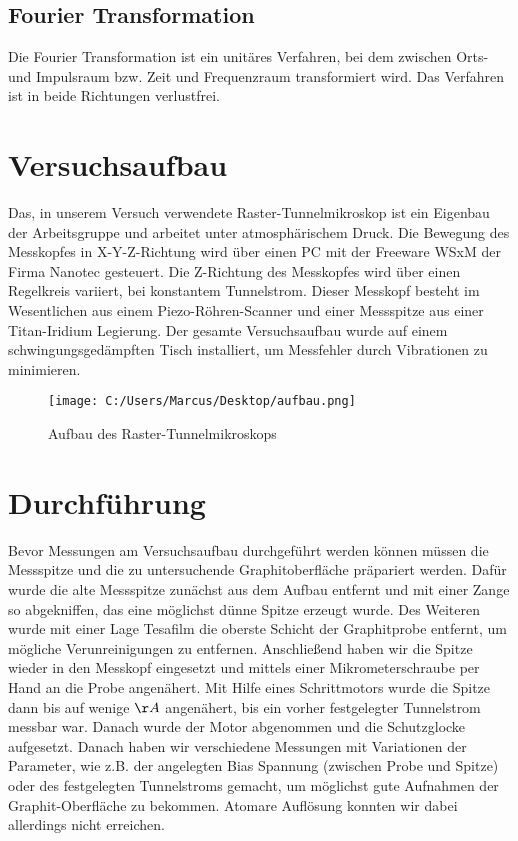 \documentclass[10pt,a4paper]{article}
\begin{document}
\subsection{	Fourier Transformation}

Die Fourier Transformation ist ein unitäres Verfahren, bei dem zwischen Orts- und Impulsraum bzw. Zeit und Frequenzraum transformiert wird. Das Verfahren ist in beide Richtungen verlustfrei.

\section{	Versuchsaufbau}

Das, in unserem Versuch verwendete Raster-Tunnelmikroskop ist ein Eigenbau der Arbeitsgruppe und arbeitet unter atmosphärischem Druck. Die Bewegung des Messkopfes in X-Y-Z-Richtung wird über einen PC mit der Freeware WSxM der Firma Nanotec gesteuert. Die Z-Richtung des Messkopfes wird über einen Regelkreis variiert, bei konstantem Tunnelstrom. Dieser Messkopf besteht im Wesentlichen aus einem Piezo-Röhren-Scanner und einer Messspitze aus einer Titan-Iridium Legierung. Der gesamte Versuchsaufbau wurde auf einem schwingungsgedämpften Tisch installiert, um Messfehler durch Vibrationen zu minimieren.

\begin{figure}[h]
	\texttt{[image: C:/Users/Marcus/Desktop/aufbau.png]}
	\centering
	\caption{Aufbau des Raster-Tunnelmikroskops}
	\label{diagramm_aufspaltung}
\end{figure}

\section{	Durchführung}

Bevor Messungen am Versuchsaufbau durchgeführt werden können müssen die Messspitze und die zu untersuchende Graphitoberfläche präpariert werden. Dafür wurde die alte Messspitze zunächst aus dem Aufbau entfernt und mit einer Zange so abgekniffen, das eine möglichst dünne Spitze erzeugt wurde. Des Weiteren wurde mit einer Lage Tesafilm die oberste Schicht der Graphitprobe entfernt, um mögliche Verunreinigungen zu entfernen. Anschließend haben wir die Spitze wieder in den Messkopf eingesetzt und mittels einer Mikrometerschraube per Hand an die Probe angenähert. Mit Hilfe eines Schrittmotors wurde die Spitze dann bis auf wenige $\AA$ angenähert, bis ein vorher festgelegter Tunnelstrom messbar war. Danach wurde der Motor abgenommen und die Schutzglocke aufgesetzt. Danach haben wir verschiedene Messungen mit Variationen der Parameter, wie z.B. der angelegten Bias Spannung (zwischen Probe und Spitze) oder des festgelegten Tunnelstroms gemacht, um möglichst gute Aufnahmen der Graphit-Oberfläche zu bekommen. Atomare Auflösung konnten wir dabei allerdings nicht erreichen.
\end{document}
